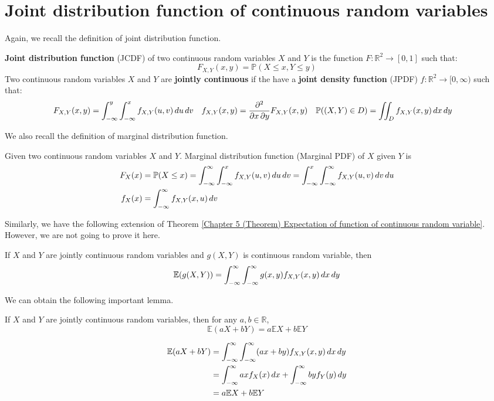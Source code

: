 \documentclass{huhtakm-template-book}
\newcommand{\prob}{\mathbb{P}}
\newcommand{\expect}{\mathbb{E}}
\begin{document}
\section{Joint distribution function of continuous random variables}
Again, we recall the definition of joint distribution function.
\begin{defn}
	\textbf{Joint distribution function} (JCDF) of two continuous  random variables $X$ and $Y$ is the function $F:\mathbb{R}^{2}\to[0,1]$ such that:
	\begin{equation*}
		F_{X,Y}(x,y)=\prob(X\leq x,Y\leq y)
	\end{equation*}
	Two continuous random variables $X$ and $Y$ are \textbf{jointly continuous} if the have a \textbf{joint density function} (JPDF) $f:\mathbb{R}^{2}\to[0,\infty)$ such that:
	\begin{align*}
		F_{X,Y}(x,y)&=\intlu{-\infty}{y}\intlu{-\infty}{x}f_{X,Y}(u,v)\,du\,dv & f_{X,Y}(x,y)&=\pdv*{F_{X,Y}(x,y)}{x,y} & \prob((X,Y)\in D)&=\iint_{D}f_{X,Y}(x,y)\,dx\,dy
	\end{align*}
\end{defn}
We also recall the definition of marginal distribution function.
\begin{defn}
	Given two continuous random variables $X$ and $Y$. Marginal distribution function (Marginal PDF) of $X$ given $Y$ is
	\begin{align*}
		F_{X}(x)&=\prob(X\leq x)=\intinfty\intlu{-\infty}{x}f_{X,Y}(u,v)\,du\,dv=\intlu{-\infty}{x}\intinfty f_{X,Y}(u,v)\,dv\,du\\
		f_{X}(x)&=\intinfty f_{X,Y}(x,u)\,dv
	\end{align*}
\end{defn}
Similarly, we have the following extension of Theorem \ref{Chapter 5 (Theorem) Expectation of function of continuous random variable}. However, we are not going to prove it here.
\begin{thm}
	If $X$ and $Y$ are jointly continuous random variables and $g(X,Y)$ is continuous random variable, then
	\begin{equation*}
		\expect(g(X,Y))=\intinfty\intinfty g(x,y)f_{X,Y}(x,y)\,dx\,dy
	\end{equation*}
\end{thm}

\newpage
We can obtain the following important lemma.
\begin{lem}
	If $X$ and $Y$ are jointly continuous random variables, then for any $a,b\in\mathbb{R}$,
	\begin{equation*}
		\expect(aX+bY)=a\expect X+b\expect Y
	\end{equation*}
\end{lem}
\begin{proofing}
	\begin{align*}
		\expect(aX+bY)&=\intinfty\intinfty(ax+by)f_{X,Y}(x,y)\,dx\,dy\\
		&=\intinfty axf_{X}(x)\,dx+\intinfty byf_{Y}(y)\,dy\\
		&=a\expect X+b\expect Y
	\end{align*}
\end{proofing}
\end{document}
